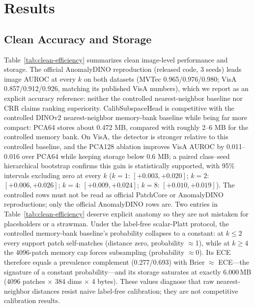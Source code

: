 \section{Results}\label{sec:results}
\subsection{Clean Accuracy and Storage}

Table~\ref{tab:clean-efficiency} summarizes clean image-level performance and storage. The official AnomalyDINO reproduction (released code, 3 seeds) leads image AUROC at every $k$ on both datasets (MVTec 0.965/0.976/0.980; VisA 0.857/0.912/0.926, matching its published VisA numbers), which we report as an explicit accuracy reference: neither the controlled nearest-neighbor baseline nor CRR claims ranking superiority. CalibSubspaceHead is competitive with the controlled DINOv2 nearest-neighbor memory-bank baseline while being far more compact: PCA64 stores about 0.472 MB, compared with roughly 2--6 MB for the controlled memory bank. On VisA, the detector is stronger relative to this controlled baseline, and the PCA128 ablation improves VisA AUROC by 0.011--0.016 over PCA64 while keeping storage below 0.6 MB; a paired class--seed hierarchical bootstrap confirms this gain is statistically supported, with 95\% intervals excluding zero at every $k$ ($k{=}1$: $[+0.003,+0.020]$; $k{=}2$: $[+0.006,+0.026]$; $k{=}4$: $[+0.009,+0.024]$; $k{=}8$: $[+0.010,+0.019]$). The controlled rows must not be read as official PatchCore or AnomalyDINO reproductions; only the official AnomalyDINO rows are. Two entries in Table~\ref{tab:clean-efficiency} deserve explicit anatomy so they are not mistaken for placeholders or a strawman. Under the label-free scalar-Platt protocol, the controlled memory-bank baseline's probability collapses to a constant: at $k\le2$ every support patch self-matches (distance zero, probability $\approx$1), while at $k\ge4$ the 4096-patch memory cap forces subsampling (probability $\approx$0). Its ECE therefore equals a prevalence complement (0.277/0.693) with Brier $\approx$ ECE---the signature of a constant probability---and its storage saturates at exactly 6.000\,MB (4096 patches $\times$ 384 dims $\times$ 4 bytes). These values diagnose that raw nearest-neighbor distances resist naive label-free calibration; they are not competitive calibration results.

